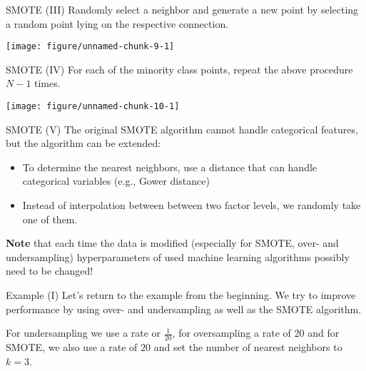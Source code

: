 \documentclass[11pt,compress,t,notes=noshow, aspectratio=169, xcolor=table]{beamer}
\begin{document}
\begin{frame}{SMOTE (III)}
\label{smote-iii}
Randomly select a neighbor and generate a new point by selecting a
random point lying on the respective connection.

\scriptsize

\begin{center}\texttt{[image: figure/unnamed-chunk-9-1]} \end{center}

\normalsize
\end{frame}

\begin{frame}{SMOTE (IV)}
\label{smote-iv}
For each of the minority class points, repeat the above procedure
\(N - 1\) times.

\scriptsize

\begin{center}\texttt{[image: figure/unnamed-chunk-10-1]} \end{center}

\normalsize
\end{frame}

\begin{frame}{SMOTE (V)}
\label{smote-v}
The original SMOTE algorithm cannot handle categorical features, but the
algorithm can be extended:

\begin{itemize}
\tightlist
\item
  To determine the nearest neighbors, use a distance that can handle
  categorical variables (e.g., Gower distance)
\item
  Instead of interpolation between between two factor levels, we
  randomly take one of them.
\end{itemize}

\textbf{Note} that each time the data is modified (especially for SMOTE,
over- and undersampling) hyperparameters of used machine learning
algorithms possibly need to be changed!
\end{frame}

\begin{frame}{Example (I)}
\label{example-i}
Let's return to the example from the beginning. We try to improve
performance by using over- and undersampling as well as the SMOTE
algorithm.

For undersampling we use a rate or \(\frac{1}{20}\), for oversampling a
rate of \(20\) and for SMOTE, we also use a rate of \(20\) and set the
number of nearest neighbors to \(k = 3\).
\end{frame}
\end{document}
